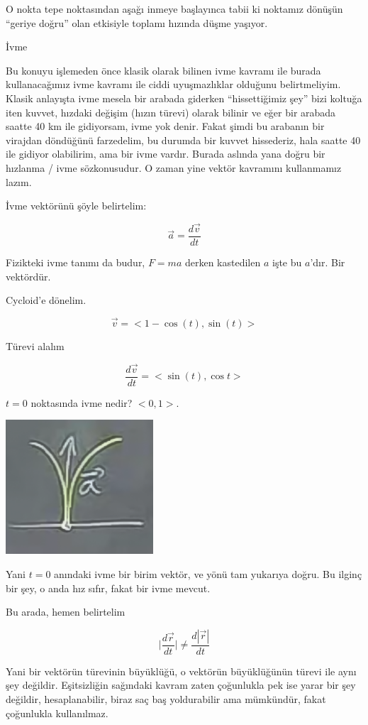 \documentclass[12pt,fleqn]{article}\usepackage{../../common}
\begin{document}
O nokta tepe noktasından aşağı inmeye başlayınca tabii ki noktamız dönüşün
``geriye doğru'' olan etkisiyle toplamı hızında düşme yaşıyor.

İvme

Bu konuyu işlemeden önce klasik olarak bilinen ivme kavramı ile burada
kullanacağımız ivme kavramı ile ciddi uyuşmazlıklar olduğunu
belirtmeliyim. Klasik anlayışta ivme mesela bir arabada giderken ``hissettiğimiz
şey'' bizi koltuğa iten kuvvet, hızdaki değişim (hızın türevi) olarak bilinir ve
eğer bir arabada saatte 40 km ile gidiyorsam, ivme yok denir. Fakat şimdi bu
arabanın bir virajdan döndüğünü farzedelim, bu durumda bir kuvvet hissederiz,
hala saatte 40 ile gidiyor olabilirim, ama bir ivme vardır. Burada aslında yana
doğru bir hızlanma / ivme sözkonusudur. O zaman yine vektör kavramını
kullanmamız lazım.

İvme vektörünü şöyle belirtelim:

$$ \vec{a} = \frac{d\vec{v}}{dt} $$

Fizikteki ivme tanımı da budur, $F = ma$ derken kastedilen $a$ işte bu
$a$'dır. Bir vektördür. 

Cycloid'e dönelim. 

$$ \vec{v} = <1-\cos(t),\sin(t)>$$

Türevi alalım

$$ \frac{d\vec{v}}{dt} = <\sin(t), \cos t>$$

$t=0$ noktasında ivme nedir? $< 0,1 >$. 

\includegraphics[height=5cm]{6_2.png}

Yani $t=0$ anındaki ivme bir birim vektör, ve yönü tam yukarıya doğru. Bu ilginç
bir şey, o anda hız sıfır, fakat bir ivme mevcut.

Bu arada, hemen belirtelim

$$ \bigg|\frac{d\vec{r}}{dt}\bigg|  \ne \frac{d|\vec{r}|}{dt}$$

Yani bir vektörün türevinin büyüklüğü, o vektörün büyüklüğünün türevi ile aynı
şey değildir. Eşitsizliğin sağındaki kavram zaten çoğunlukla pek ise yarar bir
şey değildir, hesaplanabilir, biraz saç baş yoldurabilir ama mümkündür, fakat
çoğunlukla kullanılmaz.
\end{document}
